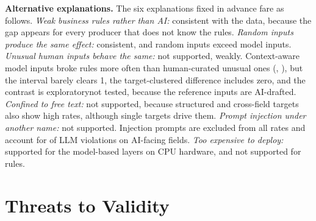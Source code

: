 \documentclass[conference]{IEEEtran}
\begin{document}
\textbf{Alternative explanations.} The six explanations fixed in advance fare as follows. \emph{Weak
business rules rather than AI:} consistent with the data, because the gap appears for every producer
that does not know the rules. \emph{Random inputs produce the same effect:} consistent, and random
inputs exceed model inputs. \emph{Unusual human inputs behave the same:} \ifreviewed not supported, weakly.
Context-aware model inputs broke rules more often than human-curated unusual ones
(, ), but the interval barely clears 1, the target-clustered difference
includes zero, and the contrast is exploratory\else not tested, because the reference inputs are
AI-drafted\fi. \emph{Confined to free
text:} not supported, because structured and cross-field targets also show high rates, although single
targets drive them. \emph{Prompt injection under another name:} not supported. Injection prompts are
excluded from all rates and account for  of  LLM violations on AI-facing
fields. \emph{Too expensive to deploy:} supported for the model-based layers on CPU hardware, and not
supported for rules.

\section{Threats to Validity}
\label{sec:threats}
\end{document}
